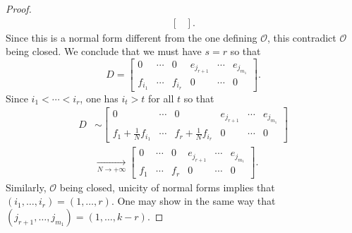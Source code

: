 \documentclass[pdftex]{sigma}
\numberwithin{equation}{section}
\theoremstyle{definition}
\theoremstyle{plain}
\theoremstyle{plain}
\theoremstyle{plain}
\theoremstyle{plain}
\begin{document}
\begin{proof}
\begin{multline*}
\begin{bmatrix}
		\end{bmatrix}.
	\end{multline*}
	Since this is a normal form different from the one defining $\mathcal O$, this contradict $\mathcal O$ being closed. We conclude that we must have $s = r$ so that
	\begin{equation*}
		D = \begin{bmatrix}
		0 & \cdots & 0  & e_{j_{r+1}} & \cdots & e_{j_{m_1}} \\
		f_{i_1} & \cdots & f_{i_{r}}  & 0 & \cdots & 0
	\end{bmatrix}.
	\end{equation*}
	Since $i_1 < \cdots < i_r$, one has $i_t > t$ for all $t$ so that
	\begin{align*}
		D &\sim \begin{bmatrix}
			0 & \cdots & 0  & e_{j_{r+1}} & \cdots & e_{j_{m_1}} \\
			f_1 + \frac{1}{N}f_{i_1} & \cdots & f_r + \frac{1}{N}f_{i_{r}}  & 0 & \cdots & 0
		\end{bmatrix} \\
		& \xrightarrow[N \to +\infty]{} \begin{bmatrix}
			0 & \cdots & 0  & e_{j_{r+1}} & \cdots & e_{j_{m_1}} \\
			f_1 & \cdots & f_r & 0 & \cdots & 0
		\end{bmatrix}.
	\end{align*}
	Similarly, $\mathcal O$ being closed, unicity of normal forms implies that $(i_1,\dots,i_r) = (1,\dots,r)$. One may show in the same way that $(j_{r+1},\dots,j_{m_1}) = (1,\dots,k-r)$.
\end{proof}
\end{document}
